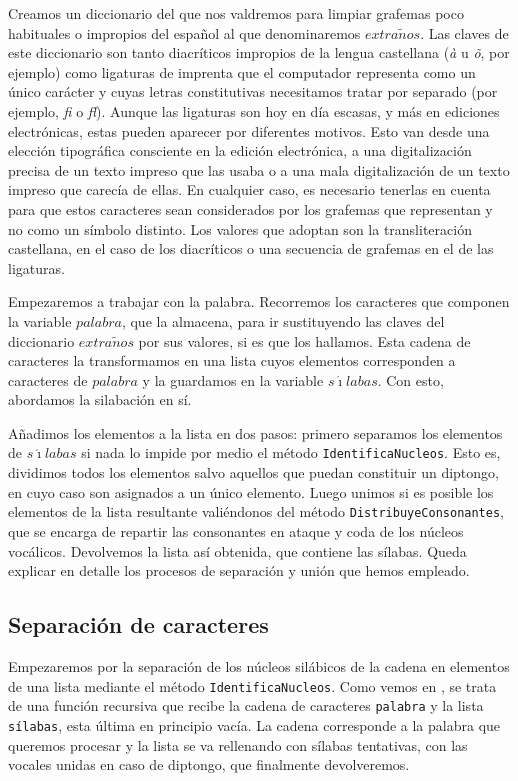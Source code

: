 Creamos un diccionario del que nos valdremos para limpiar grafemas poco habituales o impropios del español al que denominaremos $extra\tilde{n}os$. Las claves de este diccionario son tanto diacríticos impropios de la lengua castellana (\textit{à} u \textit{õ}, por ejemplo) como ligaturas de imprenta que el computador representa como un único carácter y cuyas letras constitutivas necesitamos tratar por separado (por ejemplo, \textit{fi} o \textit{fl}). Aunque las ligaturas son hoy en día escasas, y más en ediciones electrónicas, estas pueden aparecer por diferentes motivos. Esto van desde una elección tipográfica consciente en la edición electrónica, a una digitalización precisa de un texto impreso que las usaba o a una mala digitalización de un texto impreso que carecía de ellas. En cualquier caso, es necesario tenerlas en cuenta para que estos caracteres sean considerados por los grafemas que representan y no como un símbolo distinto. Los valores que adoptan son la transliteración castellana, en el caso de los diacríticos o una secuencia de grafemas en el de las ligaturas. 

Empezaremos a trabajar con la palabra. Recorremos los caracteres que componen la variable $palabra$, que la almacena, para ir sustituyendo las claves del diccionario  $extra\tilde{n}os$ por sus valores, si es que los hallamos.  Esta cadena de caracteres la transformamos en una lista cuyos elementos corresponden a caracteres de $palabra$ y la guardamos en la variable $s\acute{\imath}labas$. Con esto, abordamos la silabación en sí.

Añadimos los elementos a la lista en dos pasos: primero separamos los elementos de $s\acute{\imath}labas$ si nada lo impide por medio el método \texttt{IdentificaNucleos}. Esto es, dividimos todos los elementos salvo aquellos que puedan constituir un diptongo, en cuyo caso son asignados a un único elemento. Luego unimos si es posible los elementos de la lista resultante valiéndonos del método \texttt{DistribuyeConsonantes}, que se encarga de repartir las consonantes en ataque y coda de los núcleos vocálicos. Devolvemos la lista así obtenida, que contiene las sílabas. Queda explicar en detalle los procesos de separación y unión que hemos empleado. 

\subsection{Separación de caracteres}
Empezaremos por la separación de los núcleos silábicos de la cadena en elementos de una lista mediante el método \texttt{IdentificaNucleos}. Como vemos en , se trata de una función recursiva que recibe la cadena de caracteres \texttt{palabra} y la lista \texttt{sílabas}, esta última en principio vacía. La cadena corresponde a la palabra que queremos procesar y la lista se va rellenando con sílabas tentativas, con las vocales unidas en caso de diptongo, que finalmente devolveremos.


